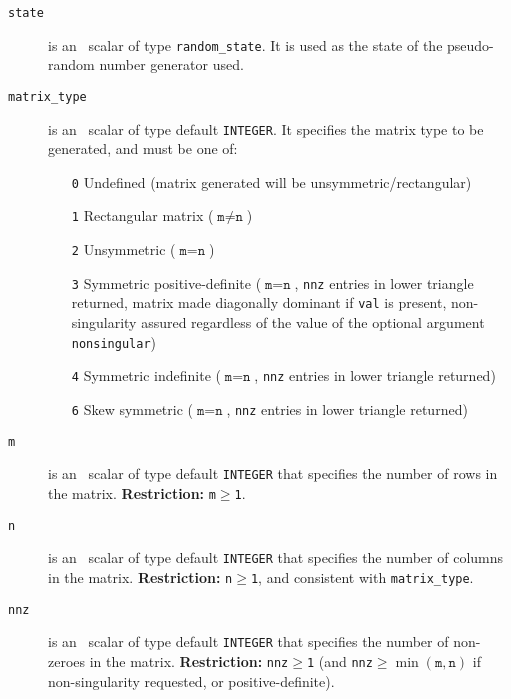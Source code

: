 \vspace*{-3mm}
\begin{description}

\item[\texttt{state}] is an \intentinout\ scalar of type {\tt random\_state}.
It is used as the state of the pseudo-random number generator used.

\item[\texttt{matrix\_type}] is an \intentin\ scalar of type default
   {\tt INTEGER}. It specifies the matrix type to be generated, and must be one
   of:
   \begin{itemize}
      \item[\tt 0] Undefined (matrix generated will be unsymmetric/rectangular)
      \item[\tt 1] Rectangular matrix ($\texttt{m}\ne\texttt{n}$)
      \item[\tt 2] Unsymmetric ($\texttt{m}=\texttt{n}$)
      \item[\tt 3] Symmetric positive-definite ($\texttt{m}=\texttt{n}$,
         \texttt{nnz} entries in lower triangle returned, matrix made
         diagonally dominant if \texttt{val} is present, non-singularity
         assured regardless of the value of the optional argument
         {\tt nonsingular})
      \item[\tt 4] Symmetric indefinite ($\texttt{m}=\texttt{n}$,
         \texttt{nnz} entries in lower triangle returned)
      \item[\tt 6] Skew symmetric ($\texttt{m}=\texttt{n}$,
         \texttt{nnz} entries in lower triangle returned)
   \end{itemize}

\item[\texttt{m}] is an \intentin\ scalar of type default {\tt INTEGER} that
   specifies the number of rows in the matrix.
{\bf Restriction:} {\tt m$\geq$1}.

\item[\texttt{n}] is an \intentin\ scalar of type default {\tt INTEGER} that
   specifies the number of columns in the matrix.
{\bf Restriction:} {\tt n$\geq$1}, and consistent with \texttt{matrix\_type}.

\item[\texttt{nnz}] is an \intentin\ scalar of type default {\tt INTEGER} that
   specifies the number of non-zeroes in the matrix.
{\bf Restriction:} {\tt nnz$\geq$1} (and \texttt{nnz}$\geq\min(\texttt{m},\texttt{n})$ if non-singularity requested, or positive-definite).


\end{description}
